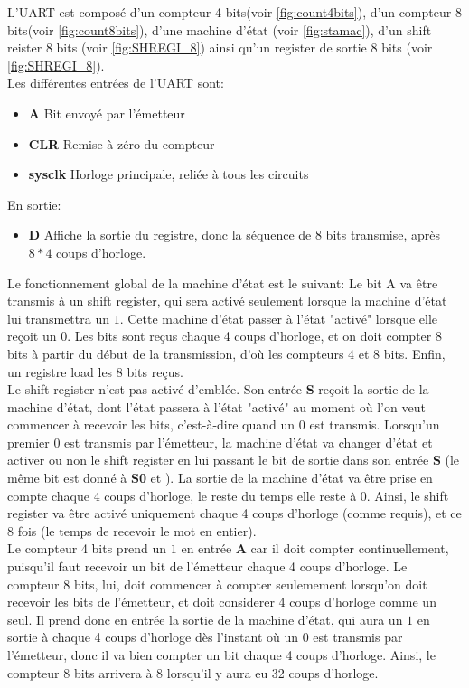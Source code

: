 \documentclass[a4paper]{article} %
\begin{document}
\begin{tcolorbox}[colframe=Monokaimagenta,colback=white]
L'UART est composé d'un compteur 4 bits(voir \ref{fig:count4bits}), d'un compteur 8 bits(voir \ref{fig:count8bits}), d'une machine d'état (voir \ref{fig:stamac}), d'un shift reister 8 bits (voir \ref{fig:SHREGI_8}) ainsi qu'un register de sortie 8 bits (voir \ref{fig:SHREGI_8}).\\    
Les différentes entrées de l'UART sont:
\begin{itemize}
    \item     \textbf{A} Bit envoyé par l'émetteur
    \item     \textbf{CLR} Remise à zéro du compteur
    \item     \textbf{sysclk} Horloge principale, reliée à tous les circuits
\end{itemize}
En sortie:
\begin{itemize}
    \item     \textbf{D} Affiche la sortie du registre, donc la séquence de 8 bits transmise, après $8*4$ coups d'horloge.
\end{itemize}
Le fonctionnement global de la machine d'état est le suivant:
Le bit A va être transmis à un shift register, qui sera activé seulement lorsque la machine d'état lui transmettra un $1$. Cette machine d'état passer à l'état "activé" lorsque elle reçoit un 0. Les bits sont reçus chaque 4 coups d'horloge, et on doit compter 8 bits à partir du début de la transmission, d'où les compteurs 4 et 8 bits. Enfin, un registre load les 8 bits reçus.\\
Le shift register n'est pas activé d'emblée. Son entrée \textbf{S} reçoit la sortie de la machine d'état, dont l'état passera à l'état "activé" au moment où l'on veut commencer à recevoir les bits, c'est-à-dire quand un $0$ est transmis.
Lorsqu'un premier $0$ est transmis par l'émetteur, la machine d'état va changer d'état et activer ou non le shift register en lui passant le bit de sortie dans son entrée \textbf{S} (le même bit est donné à \textbf{S0} et ). La sortie de la machine d'état va être prise en compte chaque 4 coups d'horloge, le reste du temps elle reste à 0. Ainsi, le shift register va être activé uniquement chaque 4 coups d'horloge (comme requis), et ce 8 fois (le temps de recevoir le mot en entier).\\
Le compteur 4 bits prend un $1$ en entrée \textbf{A} car il doit compter continuellement, puisqu'il faut recevoir un bit de l'émetteur chaque 4 coups d'horloge. Le compteur 8 bits, lui, doit commencer à compter seulemement lorsqu'on doit recevoir les bits de l'émetteur, et doit considerer 4 coups d'horloge comme un seul. Il prend donc en entrée la sortie de la machine d'état, qui aura un $1$ en sortie à chaque 4 coups d'horloge dès l'instant où un 0 est transmis par l'émetteur, donc il va bien compter un bit chaque 4 coups d'horloge. Ainsi, le compteur 8 bits arrivera à 8 lorsqu'il y aura eu 32 coups d'horloge.\\

\end{tcolorbox}
\end{document}
